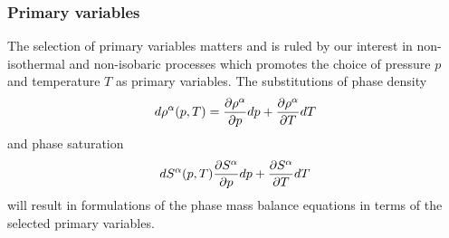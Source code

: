 \subsubsection{Primary variables}

The selection of primary variables matters and is ruled by our interest in non-isothermal and non-isobaric processes which promotes the choice of pressure $p$ and temperature $T$ as primary variables.
%
The substitutions of phase density 
\begin{align}
d\rho^\alpha (p,T)
=
\frac{\p \rho^\alpha}{\p p} dp + \frac{\p \rho^\alpha}{\p T} dT
\label{eqn:pv1}
\end{align}
and phase saturation
\begin{align}
dS^\alpha (p,T)
\frac{\p S^\alpha}{\p p} dp + \frac{\p S^\alpha}{\p T} dT
\label{eqn:pv2}
\end{align}
will result in formulations of the phase mass balance equations in terms of the selected primary variables.
